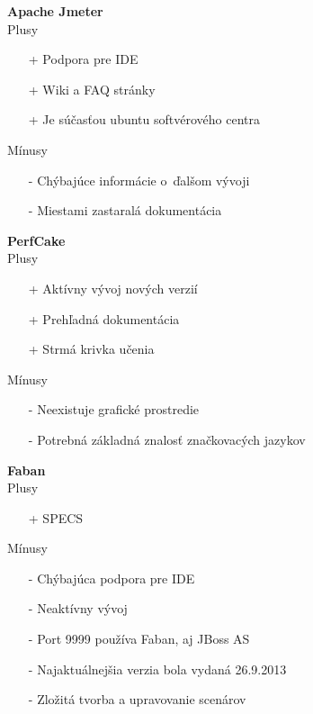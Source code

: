 \documentclass[12pt,oneside,final]{fithesis-utf8}
\begin{document}
\textbf{Apache Jmeter}
\newline \\
Plusy
\begin{itemize}
\item[+] Podpora pre IDE
\item[+] Wiki a FAQ stránky
\item[+] Je súčasťou ubuntu softvérového centra \\
\end{itemize}

\noindent Mínusy
\begin{itemize}
\item[-] Chýbajúce informácie o~ďalšom vývoji
\item[-] Miestami zastaralá dokumentácia \\
\end{itemize}

\noindent \textbf{PerfCake}
\newline \\
Plusy
\begin{itemize}
\item[+] Aktívny vývoj nových verzií
\item[+] Prehľadná dokumentácia
\item[+] Strmá krivka učenia \\
\end{itemize}

\newpage

\noindent Mínusy
\begin{itemize}
\item[-] Neexistuje grafické prostredie
\item[-] Potrebná základná znalosť značkovacých jazykov \\
\end{itemize}

\noindent \textbf{Faban}
\newline \\
Plusy
\begin{itemize}
\item[+] SPECS
\end{itemize}

\noindent Mínusy
\begin{itemize}
\item[-] Chýbajúca podpora pre IDE
\item[-] Neaktívny vývoj
\item[-] Port 9999 používa Faban, aj JBoss AS
\item[-] Najaktuálnejšia verzia bola vydaná 26.9.2013 
\item[-] Zložitá tvorba a upravovanie scenárov \\
\end{itemize}
\end{document}

